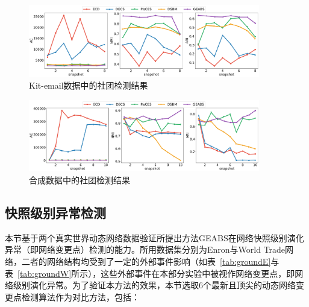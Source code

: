 \begin{figure}
	\centering
	\includegraphics[width=0.9\textwidth]{figures/chap05/Kit-emaili2Communitydetection.pdf}
	\caption{Kit-email数据中的社团检测结果}
	\label{fig4:kit-email}
\end{figure}
\begin{figure}
	\centering
	\includegraphics[width=0.9\textwidth]{figures/chap05/mergesplitC.pdf}
	\caption{合成数据中的社团检测结果}
	\label{fig4:mergesplitC}
\end{figure}


 
 
\subsection{快照级别异常检测}

本节基于两个真实世界动态网络数据验证所提出方法GEABS在网络快照级别演化异常（即网络变更点）检测的能力。所用数据集分别为Enron与World Trade网络，二者的网络结构均受到了一定的外部事件影响（如表~\ref{tab:groundE}与表~\ref{tab:groundW}所示），这些外部事件在本部分实验中被视作网络变更点，即网络级别演化异常。为了验证本方法的效果，本节选取$6$个最新且顶尖的动态网络变更点检测算法作为对比方法，包括：

